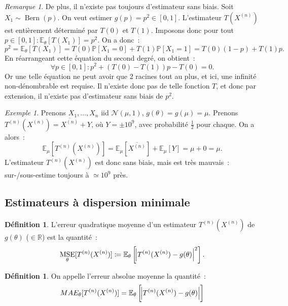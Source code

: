 \documentclass{report}
\DeclareMathOperator{\Bern}{Bern}  %
\DeclareMathOperator{\MSE}{MSE}
\renewcommand{\P}{\mathbb P}
\newcommand{\E}{\mathbb E}
\newcommand{\R}{\mathbb R}
\newcommand{\n}{{(n)}}
\newcommand{\Xn}{{X^\n}}
\newcommand{\Tn}{{T^\n}}
\newcommand{\TnXn}{{\Tn(\Xn)}}
\theoremstyle{definition}
\newtheorem{déf}[thm]{Définition}
\theoremstyle{remark}
\newtheorem*{rmq}{Remarque}
\newtheorem{ex}{Exemple}[chapter]
\begin{document}
			\begin{rmq} De plus, il n'existe pas toujours d'estimateur sans biais. Soit $X_1 \sim \Bern(p)$. On veut estimer $g(p) = p^2 \in [0, 1]$. L'estimateur
			$T(X^{(n)})$ est entièrement déterminé par $T(0)$ et $T(1)$. Imposons donc pour tout $p \in [0, 1] : \E_\theta[T(X_1)] = p^2$. On a donc~:
			\[p^2 = \E_\theta[T(X_1)] = T(0)\P[X_1 = 0] + T(1)\P[X_1 = 1] = T(0)(1-p) + T(1)p.\]
			En réarrangeant cette équation du second degré, on obtient~:
			\[\forall p \in [0, 1] : p^2 + (T(0) - T(1))p - T(0) = 0.\]
			Or une telle équation ne peut avoir que 2 racines tout au plus, et ici, une infinité non-dénombrable est requise. Il n'existe donc pas de telle fonction $T$,
			et donc par extension, il n'existe pas d'estimateur sans biais de $p^2$.
			\end{rmq}

			\begin{ex} Prenons $X_1, \ldots, X_n$ iid $\mathcal N(\mu, 1)$, $g(\theta) = g(\mu) = \mu$. Prenons $\TnXn = \overline \Xn  + Y$, où $Y = \pm 10^9$, avec
			probabilité $\frac 12$ pour chaque. On a alors~:
			\[\E_\mu[\TnXn] = \E_\mu[\overline \Xn] + \E_\mu[Y] = \mu + 0 = \mu.\]
			L'estimateur $\TnXn$ est donc sans biais, mais est très mauvais~: sur-/sous-estime toujours à $\simeq 10^9$ près.
			\end{ex}

		\subsection{Estimateurs à dispersion minimale}
			\begin{déf} L'erreur quadratique moyenne d'un estimateur $\TnXn$ de $g(\theta)$ ($\in \R$) est la quantité~:
			\[\MSE_\theta[\TnXn] \coloneqq \E_\theta\left[\abs {\TnXn - g(\theta)}^2\right].\]
			\end{déf}

			\begin{déf} On appelle l'erreur absolue moyenne la quantité~:
			\[MAE_\theta[\TnXn] = \E_\theta\left[\abs {\TnXn - g(\theta)}\right]\]
			\end{déf}
\end{document}
